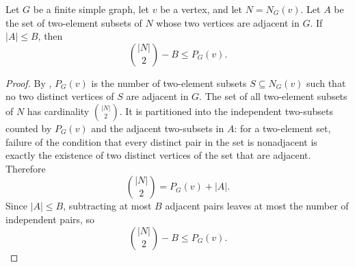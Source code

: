 \begin{helper}
Let $G$ be a finite simple graph, let $v$ be a vertex, and let
$N=N_G(v)$.  Let $A$ be the set of two-element subsets of $N$ whose two
vertices are adjacent in $G$.  If $|A|\le B$, then
\[
\binom{|N|}{2}-B\le P_G(v).
\]
\end{helper}
\begin{proof}
By , $P_G(v)$ is the number of two-element
subsets $S\subseteq N_G(v)$ such that no two distinct vertices of $S$ are
adjacent in $G$.  The set of all two-element subsets of $N$ has cardinality
$\binom{|N|}{2}$.  It is partitioned into the independent two-subsets counted
by $P_G(v)$ and the adjacent two-subsets in $A$: for a two-element set, failure
of the condition that every distinct pair in the set is nonadjacent is exactly
the existence of two distinct vertices of the set that are adjacent.  Therefore
\[
\binom{|N|}{2}=P_G(v)+|A|.
\]
Since $|A|\le B$, subtracting at most $B$ adjacent pairs leaves at most the
number of independent pairs, so
\[
\binom{|N|}{2}-B\le P_G(v).
\]
\end{proof}
